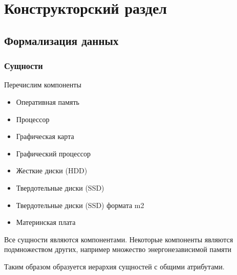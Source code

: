 \chapter{Конструкторский раздел}

\section{Формализация данных}
\subsection{Сущности}

Перечислим компоненты
\begin{itemize}
  \item 
    Оперативная память
  \item 
    Процессор
  \item 
    Графическая карта
  \item 
    Графический процессор
  \item
    Жесткие диски (HDD)
  \item 
    Твердотельные диски (SSD)
  \item 
    Твердотельные диски (SSD) формата m2
  \item 
    Материнская плата
\end{itemize}
Все сущности являются компонентами. Некоторые компоненты являются подмножеством других, например множество энергонезависимой памяти

Таким образом образуется иерархия сущностей с общими атрибутами.

